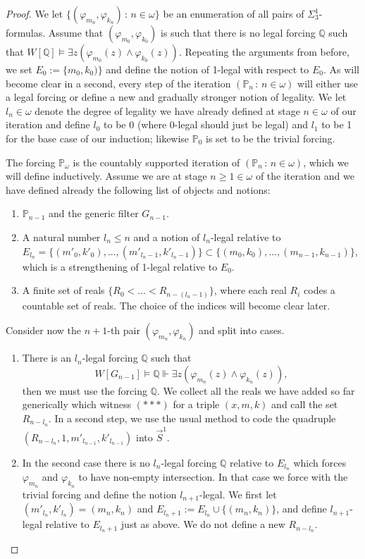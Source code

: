 \documentclass[a4paper,11pt]{article}
\newcommand{\forceP}{\mathbb{P}}
\newcommand{\forceQ}{\mathbb{Q}}
\begin{document}
\begin{proof}
We let $\{(\varphi_{m_n}, \varphi_{k_n}) \, : \, n \in \omega \}$ be an enumeration of all pairs of $\Sigma^1_3$-formulas. Assume that $(\varphi_{m_0}, \varphi_{k_0})$ is such that there is no legal forcing $\forceQ$ such that $W[\forceQ] \models \exists z (\varphi_{m_0}(z) \land \varphi_{k_0}(z))$. Repeating the arguments from before, we set $E_0:=\{m_0,k_0) \}$ and define the notion of 1-legal with respect to $E_0$.
As will become clear in a second, every step of the iteration $(\forceP_n \, : \, {n \in\omega})$ will either use a legal forcing or define a new and gradually stronger notion of legality. We let $l_n \in \omega$ denote the degree of legality we have already defined at stage $n \in \omega$ of our iteration and define $l_0$ to be $0$ (where 0-legal should just be legal) and $l_1$ to be 1 for the base case of our induction; likewise $\forceP_0$ is set to be the trivial forcing.

The forcing $\forceP_{\omega}$ is the countably supported iteration of $(\forceP_n \, : \,n \in \omega)$, which we will define inductively.
Assume we are at stage $n  \ge 1 \in \omega$ of the iteration and we have defined already the following list of objects and notions:
\begin{enumerate}
\item $\forceP_{n-1}$ and the generic filter $G_{n-1}$.
\item A natural number $l_n \le n$ and a notion of $l_n$-legal relative to $E_{l_n}= \{ (m'_0,k'_0),...,(m'_{l_n-1},k'_{l_n-1}) \} \subset \{ (m_0,k_0),...,(m_{n-1},k_{n-1}) \} $, which is a strengthening of 1-legal relative to $E_0$.
\item A finite set of reals  $\{R_0<...<R_{n - (l_n -1)} \}$, where each real $R_i$ codes a countable set of reals. The choice of the indices will become clear later.

\end{enumerate}
Consider now the $n+1$-th pair $(\varphi_{m_n}, \varphi_{k_n})$ and split into cases.

\begin{enumerate}
\item[$(a)$] There is an $l_n$-legal forcing $\forceQ$ such that \[W[G_{n-1}] \models \forceQ \Vdash \exists z (\varphi_{m_n} (z) \land \varphi_{k_n} (z)), \] then we must use the forcing $\forceQ$. We collect all the reals we have added so far generically which witness $({\ast} {\ast} {\ast})$ for a triple $(x,m,k)$ and call the set $R_{n-l_n}$. In a second step, we use the usual method to code the quadruple $(R_{{n-l_n}}, 1,m'_{l_{n-1}},k'_{l_{n-1}} )$ into $\vec{S}^1$. 
\item[$(b)$] In the second case there is no $l_{n}$-legal forcing $\forceQ$ relative to $E_{l_n}$ which forces $\varphi_{m_n}$ and $\varphi_{k_n}$ to have non-empty intersection. In that case we force with the trivial forcing and define the notion $l_{n+1}$-legal. We first let $(m'_{l_n},k'_{l_n})=(m_n,k_n)$ and $E_{l_n +1}:= E_{l_n} \cup \{(m_n,k_n)\}$, and define $l_{n+1}$-legal relative to $E_{l_n+1}$ just as above. 
We  do not define a new $R_{n-l_n}$.
\end{enumerate}


\end{proof}
\end{document}
